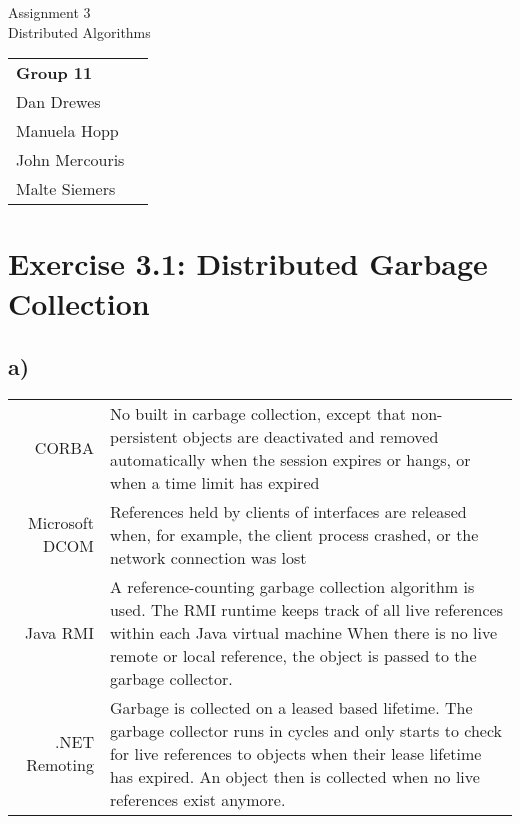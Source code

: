 \documentclass[12pt,a4paper]{article}
\begin{document}
\begin{center}
  \Large Assignment 3 \\
  \large Distributed Algorithms
\end{center}
\begin{flushright}
  \begin{tabular}{ll}
    \textbf{Group 11} \\
    Dan Drewes        \\ 
    Manuela Hopp      \\ 
    John Mercouris    \\
    Malte Siemers     \\
  \end{tabular} 
\end{flushright}

\section*{Exercise 3.1: Distributed Garbage Collection}
\subsection*{a)}
\begin{tabular}{r|p{10cm}}
CORBA & No built in carbage collection, except that non-persistent objects are deactivated and removed automatically when the
session expires or hangs, or when a time limit has expired \\[0.2cm]
Microsoft DCOM & References held by clients of interfaces are released when, for example, the client process crashed, or the
network connection was lost \\[0.2cm]
Java RMI & A reference-counting garbage collection algorithm is used. The RMI runtime keeps track of all live references within
each Java virtual machine When there is no live remote or local reference, the object is passed to the garbage collector.\\[0.2cm]
.NET Remoting & Garbage is collected on a leased based lifetime. The garbage collector runs in cycles and only starts to check for
live references to objects when their lease lifetime has expired. An object then is collected when no live references exist
anymore.
\end{tabular}

\end{document}
